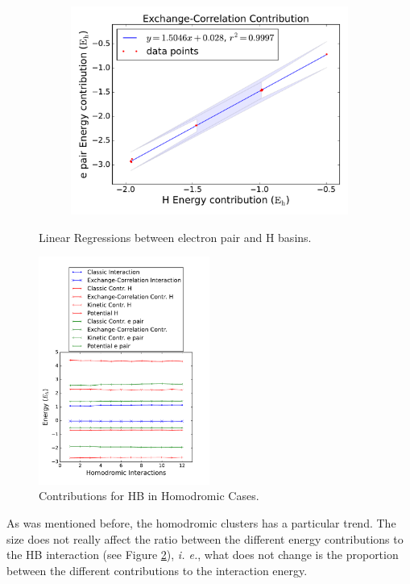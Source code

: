 \begin{figure}[hb]
\begin{subfigure}[b]{0.32\textwidth}
         \includegraphics[width=\textwidth]{4/plots/promelf/rl_xc1_xc2}
     \end{subfigure}
        \caption{Linear Regressions between electron pair and H basins.}
        \label{rlineales}
\end{figure}

\pagebreak

\begin{figure}
    \centering
    \includegraphics[width=0.5\textwidth]{4/plots/promelf/homodromic1.pdf}
    \caption{Contributions for HB in Homodromic Cases.}
    \label{homodromic}
\end{figure}

As was mentioned before, the homodromic clusters has a particular trend. The
size does not really affect the ratio between the different energy
contributions to the HB interaction (see Figure \ref{homodromic}), \textit{i.
e.}, what does not change is the proportion between the different contributions
to the interaction energy.

